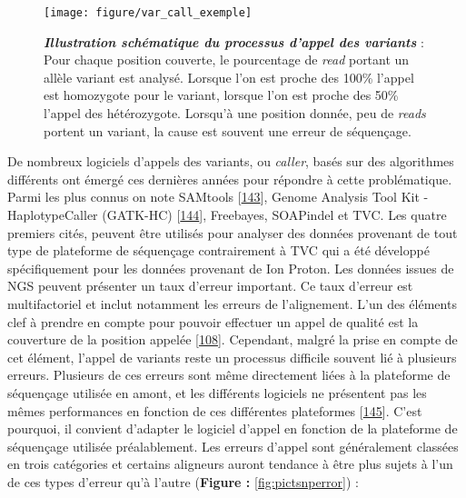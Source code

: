 \documentclass[12pt,a4paper,twoside]{ugathesis}
\theoremstyle{definition}
\theoremstyle{definition}
\theoremstyle{definition}
\theoremstyle{remark}
\begin{document}
\begin{figure}

{\centering \texttt{[image: figure/var\_call\_exemple]} 

}

\caption[Illustration schématique du processus d'appel des variants]{\textbf{\emph{Illustration schématique du
processus d'appel des variants}} : Pour chaque position couverte, le
pourcentage de \emph{read} portant un allèle variant est analysé.
Lorsque l'on est proche des 100\% l'appel est homozygote pour le
variant, lorsque l'on est proche des 50\% l'appel des hétérozygote.
Lorsqu'à une position donnée, peu de \emph{reads} portent un variant, la
cause est souvent une erreur de séquençage.}\label{fig:picvarcallprocess}
\end{figure}









De nombreux logiciels d'appels des variants, ou \emph{caller}, basés sur
des algorithmes différents ont émergé ces dernières années pour répondre
à cette problématique. Parmi les plus connus on note SAMtools
{[}\protect\hyperlink{ref-Li2009}{143}{]}, Genome Analysis Tool Kit -
HaplotypeCaller (GATK-HC)
{[}\protect\hyperlink{ref-McKenna2010}{144}{]}, Freebayes, SOAPindel et
TVC. Les quatre premiers cités, peuvent être utilisés pour analyser des
données provenant de tout type de plateforme de séquençage contrairement
à TVC qui a été développé spécifiquement pour les données provenant de
Ion Proton. Les données issues de NGS peuvent présenter un taux d'erreur
important. Ce taux d'erreur est multifactoriel et inclut notamment les
erreurs de l'alignement. L'un des éléments clef à prendre en compte pour
pouvoir effectuer un appel de qualité est la couverture de la position
appelée {[}\protect\hyperlink{ref-Sims2014}{108}{]}. Cependant, malgré
la prise en compte de cet élément, l'appel de variants reste un
processus difficile souvent lié à plusieurs erreurs. Plusieurs de ces
erreurs sont même directement liées à la plateforme de séquençage
utilisée en amont, et les différents logiciels ne présentent pas les
mêmes performances en fonction de ces différentes plateformes
{[}\protect\hyperlink{ref-Hwang2015}{145}{]}. C'est pourquoi, il
convient d'adapter le logiciel d'appel en fonction de la plateforme de
séquençage utilisée préalablement. Les erreurs d'appel sont généralement
classées en trois catégories et certains aligneurs auront tendance à
être plus sujets à l'un de ces types d'erreur qu'à l'autre
(\textbf{Figure : }\ref{fig:pictsnperror}) :
\end{document}
